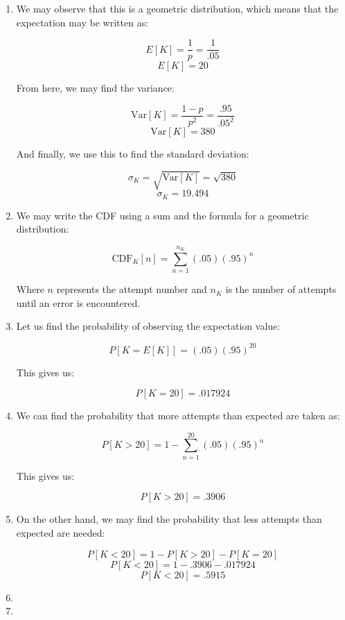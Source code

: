 \begin{enumerate}
    \begin{enumerate}

      \item We may observe that this is a geometric distribution, which means that the expectation may be written as:

        $$E[K]=\frac{1}{p}=\frac{1}{.05}$$
        $$\boxed{E[K]=20}$$

        From here, we may find the variance:

        $$\text{Var}[K]=\frac{1-p}{p^2}=\frac{.95}{.05^2}$$
        $$\boxed{\text{Var}[K]=380}$$

        And finally, we use this to find the standard deviation:

        $$\sigma_K=\sqrt{\text{Var}[K]}=\sqrt{380}$$
        $$\boxed{\sigma_K=19.494}$$

      \item We may write the CDF using a sum and the formula for a geometric distribution:

        $$\boxed{\text{CDF}_K[n]=\sum_{n=1}^{n_K}(.05)(.95)^n}$$

        Where $n$ represents the attempt number and $n_K$ is the number of attempts until an error is encountered.

      \item Let us find the probability of observing the expectation value:

        $$P[K=E[K]]=(.05)(.95)^{20}$$

        This gives us:

        $$\boxed{P[K=20]=.017924}$$

      \item We can find the probability that more attempts than expected are taken as:

        $$P[K>20]=1-\sum_{n=1}^{20}(.05)(.95)^n$$

        This gives us:

        $$\boxed{P[K>20]=.3906}$$

      \item On the other hand, we may find the probability that less attempts than expected are needed:

        $$P[K<20]=1-P[K>20]-P[K=20]$$
        $$P[K<20]=1-.3906-.017924$$
        $$\boxed{P[K<20]=.5915}$$

      \item 

      \item 


\end{enumerate}
\end{enumerate}
